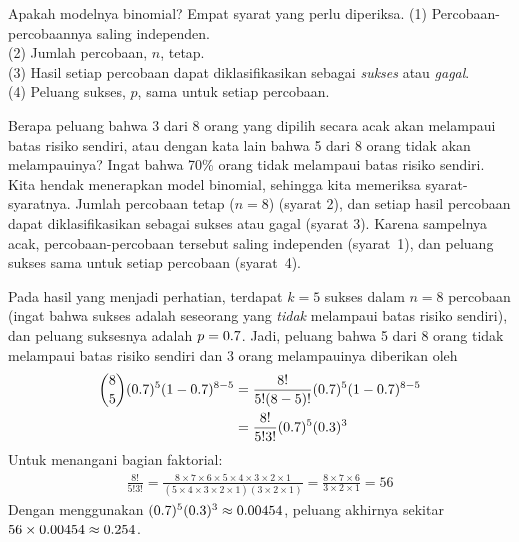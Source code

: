 \begin{onebox}{Apakah modelnya binomial? Empat syarat yang perlu diperiksa.}
  \label{isItBinomialTipBox}%
  (1) Percobaan-percobaannya saling independen. \\
  (2) Jumlah percobaan, $n$, tetap. \\
  (3) Hasil setiap percobaan dapat diklasifikasikan sebagai
      \emph{sukses} atau \emph{gagal}. \\
  (4) Peluang sukses, $p$, sama untuk setiap percobaan.
\end{onebox}

\D{\newpage}

\begin{examplewrap}
\begin{nexample}{Berapa peluang bahwa 3 dari 8 orang yang dipilih secara
    acak akan melampaui batas risiko sendiri, atau dengan kata lain bahwa
    5 dari 8 orang tidak akan melampauinya? Ingat bahwa
    70\% orang tidak melampaui batas risiko sendiri.}
  Kita hendak menerapkan model binomial, sehingga kita memeriksa
  syarat-syaratnya. Jumlah percobaan tetap ($n=8$) (syarat 2), dan
  setiap hasil percobaan dapat diklasifikasikan sebagai sukses atau gagal
  (syarat 3). Karena sampelnya acak, percobaan-percobaan tersebut saling
  independen (syarat~1), dan peluang sukses sama untuk setiap percobaan
  (syarat~4).

  Pada hasil yang menjadi perhatian, terdapat $k=5$ sukses dalam $n=8$
  percobaan (ingat bahwa sukses adalah seseorang yang \emph{tidak}
  melampaui batas risiko sendiri), dan peluang suksesnya adalah
  $p=0.7{}$. Jadi, peluang bahwa 5 dari 8 orang tidak melampaui
  batas risiko sendiri dan 3 orang melampauinya diberikan oleh
  \begin{align*}
  { 8 \choose 5}(0.7{})^5
  (1-0.7{})^{8-5}
    &= \frac{8!}{5!(8-5)!}
        (0.7{})^5(1-0.7{})^{8-5} \\
    &= \frac{8!}{5!3!}
        (0.7{})^5(0.3{})^3
  \end{align*}
  Untuk menangani bagian faktorial:
  \begin{align*}
  \frac{8!}{5!3!}
    = \frac{8\times7\times6\times5\times4\times3\times2\times1}
        {(5\times4\times3\times2\times1)(3\times2\times1)}
    = \frac{8\times7\times6}{3\times2\times1}
    = 56
  \end{align*}
  Dengan menggunakan $(0.7{})^5(0.3{})^3
    \approx 0.00454{}$,
  peluang akhirnya sekitar
  $56 \times 0.00454{}
    \approx 0.254{}$.
\end{nexample}
\end{examplewrap}

